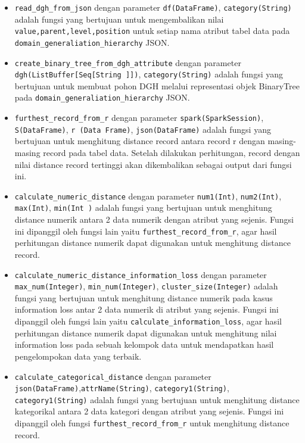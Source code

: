 \begin{itemize}
\item \texttt{read\_dgh\_from\_json} dengan parameter \texttt{df(DataFrame)}, \texttt{category(String)} adalah fungsi yang bertujuan untuk mengembalikan nilai \texttt{value,parent,level,position} untuk setiap nama atribut tabel data pada \texttt{domain\_generaliation\_hierarchy} JSON.

\item \texttt{create\_binary\_tree\_from\_dgh\_attribute} dengan parameter \texttt{dgh(ListBuffer[Seq[String ]])}, \texttt{category(String)} adalah fungsi yang bertujuan untuk membuat pohon DGH melalui representasi objek BinaryTree pada \texttt{domain\_generaliation\_hierarchy} JSON.

\item \texttt{furthest\_record\_from\_r} dengan parameter \texttt{spark(SparkSession)}, \texttt{S(DataFrame)}, \texttt{r (Data Frame)}, \texttt{json(DataFrame)} adalah fungsi yang bertujuan untuk menghitung distance record antara record r dengan masing-masing record pada tabel data. Setelah dilakukan perhitungan, record dengan nilai distance record tertinggi akan dikembalikan sebagai output dari fungsi ini.

\item \texttt{calculate\_numeric\_distance} dengan parameter \texttt{num1(Int)}, \texttt{num2(Int)}, \texttt{max(Int)}, \texttt{min(Int )} adalah fungsi yang bertujuan untuk menghitung distance numerik antara 2 data numerik dengan atribut yang sejenis. Fungsi ini dipanggil oleh fungsi lain yaitu \texttt{furthest\_record\_from\_r}, agar hasil perhitungan distance numerik dapat digunakan untuk menghitung distance record.

\item \texttt{calculate\_numeric\_distance\_information\_loss} dengan parameter \texttt{max\_num(Integer)}, \texttt{min\_num(Integer)}, \texttt{cluster\_size(Integer)} adalah fungsi yang bertujuan untuk menghitung distance numerik pada kasus information loss antar 2 data numerik di atribut yang sejenis. Fungsi ini dipanggil oleh fungsi lain yaitu \texttt{calculate\_information\_loss}, agar hasil perhitungan distance numerik dapat digunakan untuk menghitung nilai information loss pada sebuah kelompok data untuk mendapatkan hasil pengelompokan data yang terbaik.

\newpage
\item \texttt{calculate\_categorical\_distance} dengan parameter \texttt{json(DataFrame)},\texttt{attrName(String)}, \texttt{category1(String)}, \texttt{category1(String)} adalah fungsi yang bertujuan untuk menghitung distance kategorikal antara 2 data kategori dengan atribut yang sejenis. Fungsi ini dipanggil oleh fungsi \texttt{furthest\_record\_from\_r} untuk menghitung distance record.


\end{itemize}
